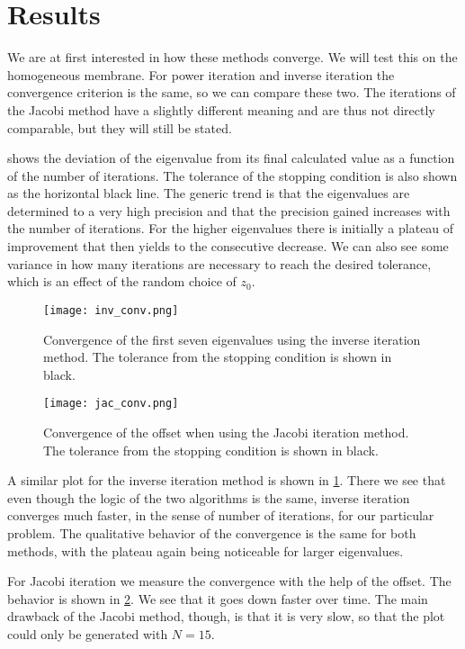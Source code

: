 \documentclass[10pt,a4paper,twocolumn]{article}
\begin{document}
\section{Results}

We are at first interested in how these methods converge. We will test this on the homogeneous membrane. For power iteration and inverse iteration the convergence criterion is the same, so we can compare these two. The iterations of the Jacobi method have a slightly different meaning and are thus not directly comparable, but they will still be stated.

 shows the deviation of the eigenvalue from its final calculated value as a function of the number of iterations. The tolerance of the stopping condition is also shown as the horizontal black line. The generic trend is that the eigenvalues are determined to a very high precision and that the precision gained increases with the number of iterations. For the higher eigenvalues there is initially a plateau of improvement that then yields to the consecutive decrease. We can also see some variance in how many iterations are necessary to reach the desired tolerance, which is an effect of the random choice of $z_0$.

\begin{figure}[!t]
    \centering
    \texttt{[image: inv\_conv.png]}
    \caption{Convergence of the first seven eigenvalues using the inverse iteration method. The tolerance from the stopping condition is shown in black.}
    \label{fig:inv_conv}
\end{figure}

\begin{figure}[!hb]
    \centering
    \texttt{[image: jac\_conv.png]}
    \caption{Convergence of the offset when using the Jacobi iteration method. The tolerance from the stopping condition is shown in black.}
    \label{fig:jac_conv}
\end{figure}

A similar plot for the inverse iteration method is shown in \cref{fig:inv_conv}. There we see that even though the logic of the two algorithms is the same, inverse iteration converges much faster, in the sense of number of iterations, for our particular problem. The qualitative behavior of the convergence is the same for both methods, with the plateau again being noticeable for larger eigenvalues.

For Jacobi iteration we measure the convergence with the help of the offset. The behavior is shown in \cref{fig:jac_conv}. We see that it goes down faster over time. The main drawback of the Jacobi method, though, is that it is very slow, so that the plot could only be generated with $N=15$.
\end{document}
